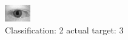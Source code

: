 \begin{figure}[h!]
\begin{center}
\includegraphics[width=0.60\columnwidth]{figures/ID632_class_2_target_3.png}
\end{center}
\caption{ Classification: 2 actual target: 3}
\label{fig:ID632_class_2_target_3}
\end{figure}

